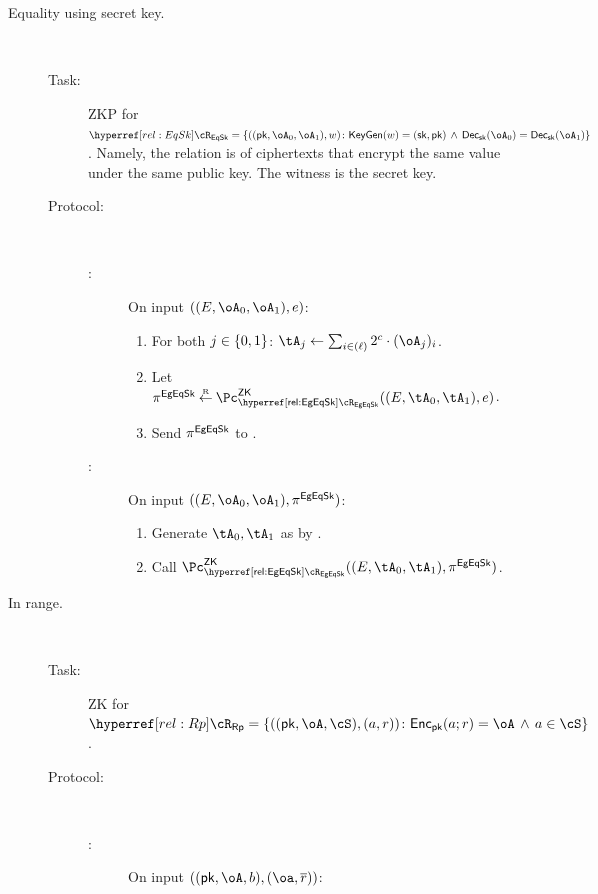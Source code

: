 \begin{description}
\item[Equality using secret key.]~




\begin{description}
	\item[Task:] ZKP for  $\rEqSk =\rEqSkDef$. Namely, the relation  is of  ciphertexts that encrypt the  same value under the same public key. The witness is the secret key.
	
	\item[Protocol:] ~
	
	\begin{description}
		\item[\Pc:] On input $((E,\oA_0,\oA_1),e)$:
		
		\begin{enumerate}
			
			\item    For both $j\in \zo$:   $\tA_j \asn  \sum_{i\in (\ell)}    2^\cs \cdot (\oA_j)_i$. 
			
			\item  Let  $\pi^\EgEqSkS \getsr \pZK{\rEgEqSk}((E,\tA_0,\tA_1), e)$.
			
			\item Send $\pi^{{\sf EgEqSk}}$ to \Vc.
		\end{enumerate}
		
		
		\item[\Vc:] On input $((E,\oA_0,\oA_1),\pi^\EgEqSkS)$:
		
		\begin{enumerate}
			\item   Generate $\tA_0,\tA_1$ as by \Pc.
			\item  Call $\pZK{\rEgEqSk}((E,\tA_0,\tA_1), \pi^\EgEqSkS)$.
			
		\end{enumerate}
		
	\end{description}
	
	
\end{description}


\item[In range.]~  

\begin{description}
	\item[Task:] ZK for $\rRp =\rRpDef$.
	
	\item[Protocol:]~
	
	\begin{description}
	\item[\Pc:] On input $((\pk,\oA,b),(\oa,\orr))$:
	

\end{description}
\end{description}
\end{description}
